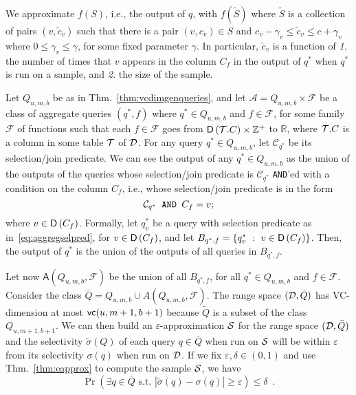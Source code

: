 We approximate $f(S)$, i.e., the output of $q$, with $f(\tilde{S})$ where
$\tilde{S}$ is a collection of pairs $(v,\tilde{c}_v)$ such that there is a pair
$(v,c_v)\in S$ and $c_v-\gamma_v \le\tilde{c}_v\le c+\gamma_v$ where $0\le
\gamma_v \le \gamma$, for some fixed parameter $\gamma$. In particular,
$\tilde{c}_v$ is a function of \emph{1.} the number of times that $v$ appears in the
column $C_f$ in the output of $q^*$ when $q^*$ is run on a sample, and \emph{2.}
the size of the sample.

Let $Q_{u,m,b}$ be as in Thm.~\ref{thm:vcdimgenqueries}, and let
$\mathcal{A}=Q_{u,m,b}\times\mathcal{F}$  be a class of aggregate queries $(q^*,f)$
where $q^*\in Q_{u,m,b}$ and $f\in\mathcal{F}$, for some family $\mathcal{F}$ of
functions such that each $f\in\mathcal{F}$ goes from
$\mathsf{D}\left({\cal T}.C\right)\times\mathbb{Z}^+$ to $\mathbb{R}$, where ${\cal T}.C$ is a column
in some table ${\cal T}$ of ${\cal D}$. For any query $q^*\in Q_{u,m,b}$, let
$\mathcal{C}_{q^*}$ be its selection/join predicate.
We can see the output of any $q^*\in Q_{u,m,b}$ as the union of the
outputs of the queries whose selection/join predicate is $\mathcal{C}_{q^*}$
\texttt{AND}'ed with a condition on the column $C_f$, i.e., whose selection/join
predicate is in the form
\begin{equation}\label{eq:aggregselpred}
  \mathcal{C}_{q^*} \mbox{\texttt{ AND }} C_f=v;
\end{equation}
where $v\in\mathsf{D}\left(C_f\right)$. Formally, let $q^*_v$ be a query with selection
predicate as in~\eqref{eq:aggregselpred}, for $v\in\mathsf{D}\left(C_f\right)$, and let
$B_{q^*,f}=\{q^*_v ~:~ v\in\mathsf{D}\left(C_f\right)\}$. Then, the output of $q^*$ is the union of the
outputs of all queries in $B_{q^*,f}$.

Let now $\mathsf{A}(Q_{u,m,b},\mathcal{F})$ be the union of all $B_{q^*,f}$, for
all $q^*\in Q_{u,m,b}$ and $f\in\mathcal{F}$. Consider the class
$\bar{Q}=Q_{u,m,b}\cup A(Q_{u,m,b},\mathcal{F})$. The range space $({\cal D},\bar{Q})$ has
VC-dimension at most $\mathsf{vc}(u,m+1,b+1)$ because $\tilde{Q}$ is a subset of the
class $Q_{u,m+1,b+1}$. We can then build an $\varepsilon$-approximation ${\cal S}$ for
the range space $({\cal D},\bar{Q})$ and the selectivity $\tilde\sigma(Q)$ of each query
$q\in\bar{Q}$ when run on ${\cal S}$ will be within $\varepsilon$ from its
selectivity $\sigma(q)$ when run on ${\cal D}$. If we fix
$\varepsilon,\delta\in(0,1)$ and use Thm.~\ref{thm:eapprox} to
compute the sample ${\cal S}$, we have
\[
\Pr(\exists q\in\bar{Q} \mbox{ s.t. }
|\tilde\sigma(q)-\sigma(q)|\ge\varepsilon)\le\delta\enspace.
\]

